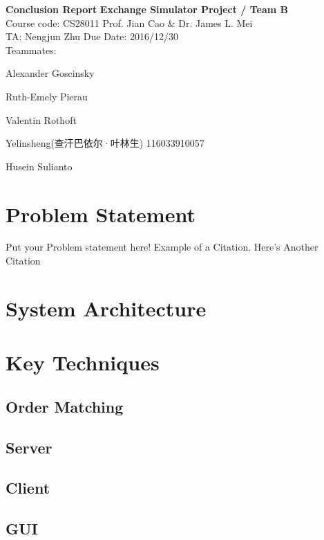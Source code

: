 \documentclass[a4paper, 11pt]{article}
\begin{document}
\noindent

\large\textbf{Conclusion Report}
\hfill \textbf{Exchange Simulator Project / Team B} \\

\normalsize Course code: CS28011 \hfill Prof. Jian Cao \& Dr. James L. Mei\\

TA: Nengjun Zhu  \hfill Due Date: 2016/12/30 \\

Teammates:

Alexander Goscinsky

Ruth-Emely Pierau

Valentin Rothoft

Yelinsheng(查汗巴依尔·叶林生) 116033910057

Husein Sulianto



\section*{Problem Statement}
Put your Problem statement here! Example of a Citation\cite[p.219]{Robotics}. Here's Another Citation\cite{Flueck}

\section*{System Architecture}
\lipsum[2]

\section*{Key Techniques}
\subsection*{Order Matching}

\subsection*{Server}

\subsection*{Client}

\subsection*{GUI}
\end{document}
